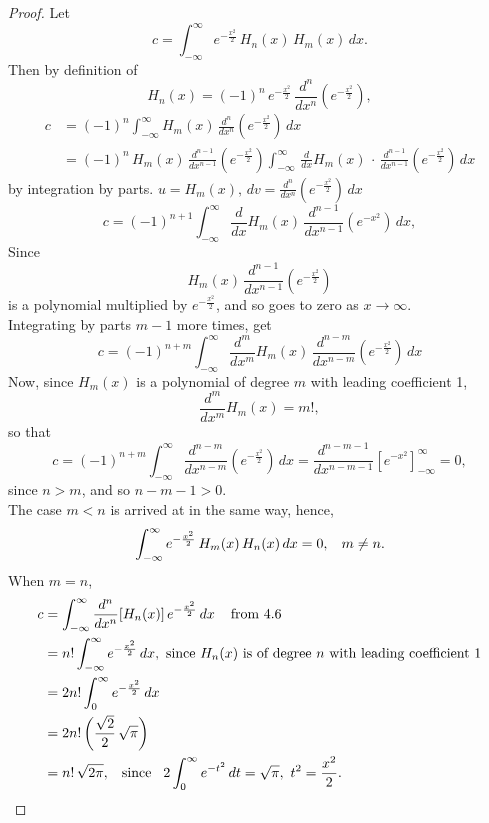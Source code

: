\documentclass[12pt,a4paper]{report}
\theoremstyle{definition}
\theoremstyle{plain}
\begin{document}
\begin{proof}
Let $$c = \int_{-\infty}^{\infty} e^{-\frac{x^2}{2}}\, H_n(x)\, H_m(x)\, dx.$$
Then by definition of 
$$H_n(x) = (-1)^n\, e^{-\frac{x^2}{2}}\, \frac{d^n}{dx^n}\left(e^{-\frac{x^2}{2}}\right),$$
\begin{align*}
c & = (-1)^n\int_{-\infty}^{\infty}H_m(x)\, \frac{d^n}{dx^n}\left(e^{-\frac{x^2}{2}}\right)\, dx\\
  & = (-1)^n\,H_m(x)\, \frac{d^{n-1}}{dx^{n-1}}\left(e^{-\frac{x^2}{2}}\right)\int^{\infty}_{-\infty}\, \frac{d}{dx}H_m(x)\, \cdot\, \frac{d^{n-1}}{dx^{n-1}}\left(e^{-\frac{x^2}{2}}\right)\, dx
\end{align*}
by integration by parts. $u = H_m(x), \, dv = \frac{d^n}{dx^n}\left(e^{-\frac{x^2}{2}}\right)\, dx$
$$c = (-1)^{n+1}\int_{-\infty}^{\infty}\frac{d}{dx}H_m(x)\, \frac{d^{n-1}}{dx^{n-1}}\left(e^{-x^2}\right)\, dx,$$
Since $$H_m(x)\, \frac{d^{n-1}}{dx^{n-1}}\left(e^{-\frac{x^2}{2}}\right)$$ is a polynomial multiplied by $e^{-\frac{x^2}{2}}$, and so goes to zero as $x\rightarrow \infty$. \\
Integrating by parts $m-1$ more times, get 
\begin{equation}
c = (-1)^{n+m}\int_{-\infty}^{\infty} \frac{d^m}{dx^m}H_m(x)\, \frac{d^{n-m}}{dx^{n-m}}\left(e^{-\frac{x^2}{2}}\right)\, dx 
\end{equation}
Now, since $H_m(x)$ is a polynomial of degree $m$ with leading coefficient 1, 
$$\frac{d^m}{dx^m}H_m(x) = m!,$$ so that
$$c = (-1)^{n+m}\int^{\infty}_{-\infty} \frac{d^{n-m}}{dx^{n-m}}\left(e^{-\frac{x^2}{2}}\right)\, dx = \frac{d^{n-m-1}}{dx^{n-m-1}}\left[e^{-x^2}\right]^{\infty}_{-\infty} = 0,$$
since $n>m$, and so $n-m-1 > 0$.\\
The case $m<n$ is arrived at in the same way, hence, 
$$\int_{-\infty}^{\infty}e^{-\frac{x^2}{2}}\, H_m(x)\, H_n(x)\, dx = 0, \hspace{0.3cm} m\neq n.$$
When $m = n$,
\begin{align*}
c & = \int_{-\infty}^{\infty}\frac{d^n}{dx^n}[H_n(x)]\, e^{-\frac{x^2}{2}}\, dx \hspace{0.4cm} \text{from 4.6}\\
  & = n! \int_{-\infty}^{\infty} e^{-\frac{x^2}{2}}\, dx,\,\, \text{since}\, \, H_n(x)\,\, \text{is of degree}\,\, n\,\, \text{with leading coefficient 1}\\
  & = 2n! \int_0^{\infty} e^{-\frac{x^2}{2}}\, dx\\
  & = 2n!\left(\frac{\sqrt{2}}{2}\,\sqrt{\pi}\right)\\
  & = n!\, \sqrt{2\pi}, \hspace{0.3cm} \text{since}\hspace{0.3cm} 2\int_0^{\infty} e^{-t^2}\, dt = \sqrt{\pi},\, \, t^2 = \frac{x^2}{2}.
\end{align*} 
\end{proof}
\end{document}
